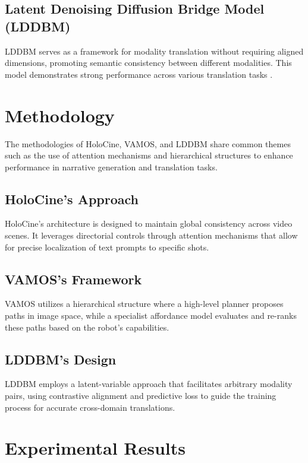 \documentclass{article}
\begin{document}
\subsection{Latent Denoising Diffusion Bridge Model (LDDBM)}
LDDBM serves as a framework for modality translation without requiring aligned dimensions, promoting semantic consistency between different modalities. This model demonstrates strong performance across various translation tasks \cite{lddbm}.

\section{Methodology}
The methodologies of HoloCine, VAMOS, and LDDBM share common themes such as the use of attention mechanisms and hierarchical structures to enhance performance in narrative generation and translation tasks. 

\subsection{HoloCine's Approach}
HoloCine's architecture is designed to maintain global consistency across video scenes. It leverages directorial controls through attention mechanisms that allow for precise localization of text prompts to specific shots.

\subsection{VAMOS's Framework}
VAMOS utilizes a hierarchical structure where a high-level planner proposes paths in image space, while a specialist affordance model evaluates and re-ranks these paths based on the robot's capabilities.

\subsection{LDDBM's Design}
LDDBM employs a latent-variable approach that facilitates arbitrary modality pairs, using contrastive alignment and predictive loss to guide the training process for accurate cross-domain translations.

\section{Experimental Results}
\end{document}
